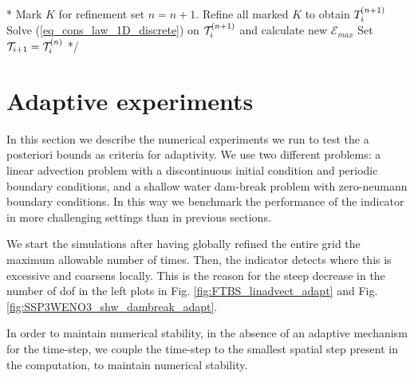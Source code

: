 \documentclass[final]{amsart}
\numberwithin{equation}{section}
\begin{document}
\/*
\State Mark $K$ for refinement
\EndIf
\EndFor
\State set $n=n+1$.
\State Refine all marked $K$ to obtain $T_i^{\!\left({n+1}\right)}$
\State Solve (\ref{eq_cons_law_1D_discrete}) on $\mathcal{T}_i^{\!\left({n+1}\right)}$ and calculate new $\mathcal{E}_{max}$
\EndWhile
\State Set $\mathcal{T}_{i+1}=\mathcal{T}_i^{\!\left({n}\right)}$
*/

\section{Adaptive experiments}\label{sec:adaptive_experiments}
In this section we describe the numerical experiments we run to test the a posteriori bounds as criteria for adaptivity.  We use two different problems: a linear advection problem with a discontinuous initial condition and periodic boundary conditions, and a shallow water dam-break problem with zero-neumann boundary conditions.  In this way we benchmark the performance of the indicator in more challenging settings than in previous sections. 
\begin{Rem} We start the simulations after having globally refined the entire grid the maximum allowable number of times.  Then, the indicator detects where this is excessive and coarsens locally.  This is the reason for  the steep decrease in the number of dof in the left plots in Fig. \ref{fig:FTBS_linadvect_adapt} and Fig. \ref{fig:SSP3WENO3_shw_dambreak_adapt}.
\end{Rem}
\begin{Rem}  In order to maintain numerical stability, in the absence of an adaptive mechanism for the time-step, we  couple the time-step to the smallest spatial step present in the computation, to maintain numerical stability.
\end{Rem}
\end{document}
